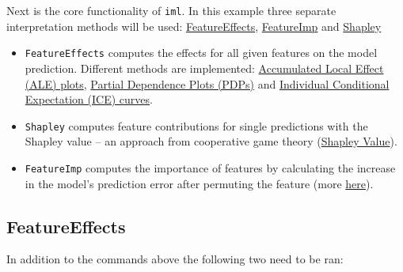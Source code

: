 \documentclass[
]{scrbook}
\newenvironment{Shaded}{\begin{snugshade}}{\end{snugshade}}
\newcommand{\AttributeTok}[1]{\textcolor[rgb]{0.77,0.63,0.00}{#1}}
\newcommand{\FunctionTok}[1]{\textcolor[rgb]{0.00,0.00,0.00}{#1}}
\newcommand{\NormalTok}[1]{#1}
\newcommand{\OtherTok}[1]{\textcolor[rgb]{0.56,0.35,0.01}{#1}}
\newcommand{\SpecialCharTok}[1]{\textcolor[rgb]{0.00,0.00,0.00}{#1}}
\newcommand{\StringTok}[1]{\textcolor[rgb]{0.31,0.60,0.02}{#1}}
\renewenvironment{Shaded} {\begin{snugshade}\small} {\end{snugshade}}
\begin{document}
Next is the core functionality of \texttt{iml}. In this example three separate interpretation methods will be used: \href{https://github.com/christophM/iml/blob/master/R/FeatureEffects.R}{FeatureEffects}, \href{https://github.com/christophM/iml/blob/master/R/FeatureImp.R}{FeatureImp} and \href{https://github.com/christophM/iml/blob/master/R/Shapley.R}{Shapley}

\begin{itemize}
\item
  \texttt{FeatureEffects} computes the effects for all given features on the model prediction. Different methods are implemented: \href{https://christophm.github.io/interpretable-ml-book/ale.html}{Accumulated Local Effect (ALE) plots}, \href{https://christophm.github.io/interpretable-ml-book/pdp.html}{Partial Dependence Plots (PDPs)} and \href{https://christophm.github.io/interpretable-ml-book/ice.html}{Individual Conditional Expectation (ICE) curves}.
\item
  \texttt{Shapley} computes feature contributions for single predictions with the Shapley value -- an approach from cooperative game theory (\href{https://christophm.github.io/interpretable-ml-book/shapley.html}{Shapley Value}).
\item
  \texttt{FeatureImp} computes the importance of features by calculating the increase in the model's prediction error after permuting the feature (more \href{https://christophm.github.io/interpretable-ml-book/feature-importance.html\#feature-importance}{here}).
\end{itemize}

\hypertarget{featureeffects}{%
\subsection{FeatureEffects}\label{featureeffects}}

In addition to the commands above the following two need to be ran:

\begin{Shaded}
\end{Shaded}
\end{document}
